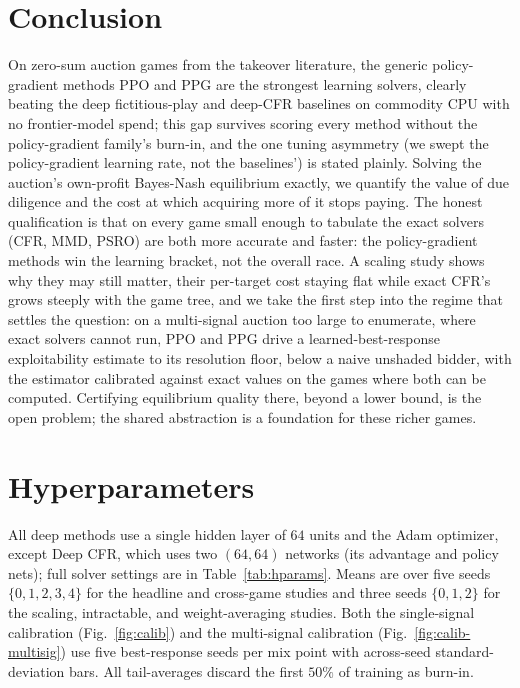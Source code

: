 \documentclass[11pt,a4paper]{article}
\begin{document}
\section{Conclusion}

On zero-sum auction games from the takeover literature, the generic policy-gradient
methods PPO and PPG are the strongest learning solvers, clearly beating the deep
fictitious-play and deep-CFR baselines on commodity CPU with no frontier-model spend;
this gap survives scoring every method without the policy-gradient family's burn-in, and
the one tuning asymmetry (we swept the policy-gradient learning rate, not the baselines')
is stated plainly. Solving the auction's own-profit Bayes-Nash equilibrium exactly, we
quantify the value of due diligence and the cost at which acquiring more of it stops paying. The
honest qualification is that on every game
small enough to tabulate the exact solvers (CFR, MMD, PSRO) are both more accurate and
faster: the policy-gradient methods win the learning bracket, not the overall race. A
scaling study shows why they may still matter, their per-target cost staying flat
while exact CFR's grows steeply with the game tree, and we take the first step into
the regime that settles the question: on a multi-signal auction too large to
enumerate, where exact solvers cannot run, PPO and PPG drive a learned-best-response
exploitability estimate to its resolution floor, below a naive unshaded bidder, with
the estimator calibrated against exact values on the games where both can be computed.
Certifying equilibrium quality there, beyond a lower bound, is the open problem; the
shared abstraction is a foundation for these richer games.

\appendix
\section{Hyperparameters}
\label{app:hparams}

All deep methods use a single hidden layer of $64$ units and the Adam optimizer,
except Deep CFR, which uses two $(64, 64)$ networks (its advantage and policy nets);
full solver settings are in Table~\ref{tab:hparams}. Means are over five seeds
$\{0,1,2,3,4\}$ for the headline and cross-game studies and three seeds $\{0,1,2\}$ for
the scaling, intractable, and weight-averaging studies. Both the single-signal calibration
(Fig.~\ref{fig:calib}) and the multi-signal calibration (Fig.~\ref{fig:calib-multisig})
use five best-response seeds per mix point with across-seed standard-deviation bars. All
tail-averages discard the first $50\%$ of training as burn-in.
\end{document}
